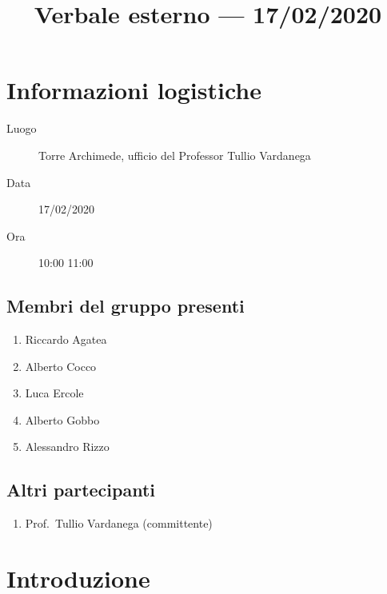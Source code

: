 \documentclass{article}
\title{Verbale esterno --- 17/02/2020}
\begin{document}


\section{Informazioni logistiche}%
\label{sec:informazioni_logistiche}

\begin{description}
  \item [Luogo] Torre Archimede, ufficio del Professor Tullio Vardanega
  \item [Data] 17/02/2020
  \item [Ora] 10:00  11:00
\end{description}

\subsection{Membri del gruppo presenti}%
\label{sub:membri_del_gruppo_presenti}

\begin{enumerate}
  \item Riccardo Agatea
  \item Alberto Cocco
  \item Luca Ercole
  \item Alberto Gobbo
  \item Alessandro Rizzo
\end{enumerate}

\subsection{Altri partecipanti}%
\label{sub:altri_partecipanti}

\begin{enumerate}
  \item Prof.\ Tullio Vardanega (committente)
\end{enumerate}


\section{Introduzione}%
\label{sec:introduzione}
\end{document}
